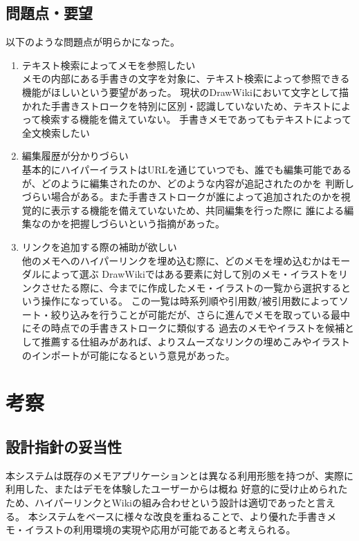\subsection{問題点・要望}
以下のような問題点が明らかになった。
\begin{enumerate}
    \item テキスト検索によってメモを参照したい\\
    メモの内部にある手書きの文字を対象に、テキスト検索によって参照できる機能がほしいという要望があった。
    現状のDrawWikiにおいて文字として描かれた手書きストロークを特別に区別・認識していないため、テキストによって検索する機能を備えていない。
    手書きメモであってもテキストによって全文検索したい
    \item 編集履歴が分かりづらい\\
    基本的にハイパーイラストはURLを通じていつでも、誰でも編集可能であるが、どのように編集されたのか、どのような内容が追記されたのかを
    判断しづらい場合がある。また手書きストロークが誰によって追加されたのかを視覚的に表示する機能を備えていないため、共同編集を行った際に
    誰による編集なのかを把握しづらいという指摘があった。
    \item リンクを追加する際の補助が欲しい\\
    他のメモへのハイパーリンクを埋め込む際に、どのメモを埋め込むかはモーダルによって選ぶ
    DrawWikiではある要素に対して別のメモ・イラストをリンクさせたる際に、今までに作成したメモ・イラストの一覧から選択するという操作になっている。
    この一覧は時系列順や引用数/被引用数によってソート・絞り込みを行うことが可能だが、さらに進んでメモを取っている最中にその時点での手書きストロークに類似する
    過去のメモやイラストを候補として推薦する仕組みがあれば、よりスムーズなリンクの埋めこみやイラストのインポートが可能になるという意見があった。
\end{enumerate}

\section{考察}

\subsection{設計指針の妥当性}
本システムは既存のメモアプリケーションとは異なる利用形態を持つが、実際に利用した、またはデモを体験したユーザーからは概ね
好意的に受け止められたため、ハイパーリンクとWikiの組み合わせという設計は適切であったと言える。
本システムをベースに様々な改良を重ねることで、より優れた手書きメモ・イラストの利用環境の実現や応用が可能であると考えられる。

